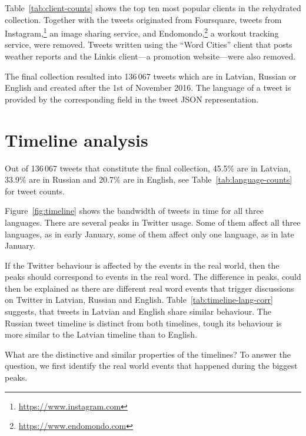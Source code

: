 \documentclass[11pt,a4paper]{article}
\begin{document}
Table~\ref{tab:client-counts} shows the top ten most popular clients in the rehydrated collection. Together with the tweets originated from Foursquare, tweets from Instagram,\footnote{\url{https://www.instagram.com}} an image sharing service, and Endomondo,\footnote{\url{https://www.endomondo.com}} a workout tracking service, were removed. Tweets written using the ``Word Cities'' client that posts weather reports and the Linkis client---a promotion website---were also removed.

The final collection resulted into 136\,067 tweets which are in Latvian, Russian or English and created after the 1st of November 2016. The language of a tweet is provided by the corresponding field in the tweet JSON representation.

\section{Timeline analysis}
\label{sec:timeline}

Out of 136\,067 tweets that constitute the final collection, 45.5\% are in Latvian, 33.9\% are in Russian and 20.7\% are in English, see Table~\ref{tab:language-counts} for tweet counts.



Figure~\ref{fig:timeline} shows the bandwidth of tweets in time for all three languages. There are several peaks in Twitter usage. Some of them affect all three languages, as in early January, some of them affect only one language, as in late January.

If the Twitter behaviour is affected by the events in the real world, then the peaks should correspond to events in the real word. The difference in peaks, could then be explained as there are different real word events that trigger discussions on Twitter in Latvian, Russian and English. Table~\ref{tab:timeline-lang-corr} suggests, that tweets in Latvian and English share similar behaviour. The Russian tweet timeline is distinct from both timelines, tough its behaviour is more similar to the Latvian timeline than to English.



What are the distinctive and similar properties of the timelines? To answer the question, we first identify the real world events that happened during the biggest peaks.
\end{document}

